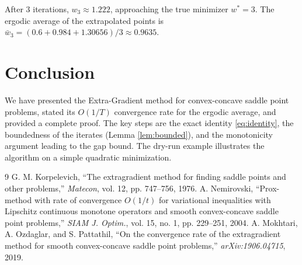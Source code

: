 \documentclass{article}
\theoremstyle{plain}
\theoremstyle{definition}
\begin{document}
After 3 iterations, $w_3 \approx 1.222$, approaching the true minimizer $w^*=3$. The ergodic average of the extrapolated points is $\bar{w}_3 = (0.6 + 0.984 + 1.30656)/3 \approx 0.9635$.

\section{Conclusion}
We have presented the Extra-Gradient method for convex-concave saddle point problems, stated its $O(1/T)$ convergence rate for the ergodic average, and provided a complete proof. The key steps are the exact identity \eqref{eq:identity}, the boundedness of the iterates (Lemma \ref{lem:bounded}), and the monotonicity argument leading to the gap bound. The dry-run example illustrates the algorithm on a simple quadratic minimization.


\begin{thebibliography}{9}
 G. M. Korpelevich, ``The extragradient method for finding saddle points and other problems,'' \emph{Matecon}, vol. 12, pp. 747--756, 1976.
 A. Nemirovski, ``Prox-method with rate of convergence $O(1/t)$ for variational inequalities with Lipschitz continuous monotone operators and smooth convex-concave saddle point problems,'' \emph{SIAM J. Optim.}, vol. 15, no. 1, pp. 229--251, 2004.
 A. Mokhtari, A. Ozdaglar, and S. Pattathil, ``On the convergence rate of the extragradient method for smooth convex-concave saddle point problems,'' \emph{arXiv:1906.04715}, 2019.
\end{thebibliography}
\end{document}
